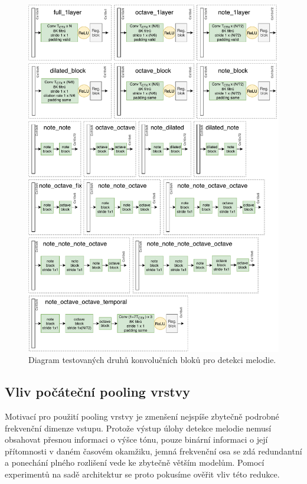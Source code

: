 \begin{figure}[h]\centering
    \includegraphics[width=\textwidth,height=\textheight,keepaspectratio]{../img/voicing_moduly}
\caption{Diagram testovaných druhů konvolučních bloků pro detekci melodie.}\label{obr:voicing_moduly}
\end{figure}

\subsection{Vliv počáteční pooling vrstvy}

Motivací pro použití pooling vrstvy je zmenšení nejspíše zbytečně podrobné frekvenční dimenze vstupu. Protože výstup úlohy detekce melodie nemusí obsahovat přesnou informaci o výšce tónu, pouze binární informaci o její přítomnosti v daném časovém okamžiku, jemná frekvenční osa se zdá redundantní a ponechání plného rozlišení vede ke zbytečně větším modelům. Pomocí experimentů na sadě architektur se proto pokusíme ověřit vliv této redukce.

